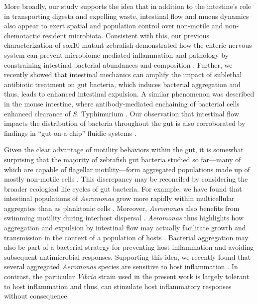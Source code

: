 More broadly, our study supports the idea that in addition to the intestine's role in transporting digesta and expelling waste, intestinal flow and mucus dynamics also appear to exert spatial and population control over non-motile and non-chemotactic resident microbiota. Consistent with this, our previous characterization of sox10 mutant zebrafish demonstrated how the enteric nervous system can prevent microbiome-mediated inflammation and pathology by constraining intestinal bacterial abundances and composition \cite{rolig_enteric_2017}. Further, we recently showed that intestinal mechanics can amplify the impact of sublethal antibiotic treatment on gut bacteria, which induces bacterial aggregation and thus, leads to enhanced intestinal expulsion\cite{schlomann_sublethal_2019}. A similar phenomenon was described in the mouse intestine, where antibody-mediated enchaining of bacterial cells enhanced clearance of \textit{S. }Typhimurium \cite{moor_high-avidity_2017}. Our observation that intestinal flow impacts the distribution of bacteria throughout the gut is also corroborated by findings in ``gut-on-a-chip'' fluidic systems \cite{cremer_effect_2016}. 

Given the clear advantage of motility behaviors within the gut, it is somewhat surprising that the majority of zebrafish gut bacteria studied so far—many of which are capable of flagellar motility—form aggregated populations made up of mostly non-motile cells \cite{wiles_modernized_2018}. This discrepancy may be reconciled by considering the broader ecological life cycles of gut bacteria. For example, we have found that intestinal populations of \textit{Aeromonas} grow more rapidly within multicellular aggregates than as planktonic cells \cite{jemielita_spatial_2014}. Moreover, \textit{Aeromonas} also benefits from swimming motility during interhost dispersal \cite{robinson_experimental_2018}. \textit{Aeromonas} thus highlights how aggregation and expulsion by intestinal flow may actually facilitate growth and transmission in the context of a population of hosts \cite{robinson_scales_2019}. Bacterial aggregation may also be part of a bacterial strategy for preventing host inflammation and avoiding subsequent antimicrobial responses. Supporting this idea, we recently found that several aggregated \textit{Aeromonas} species are sensitive to host inflammation \cite{rolig_bacterial_2018}. In contrast, the particular \textit{Vibrio} strain used in the present work is largely tolerant to host inflammation \cite{rolig_individual_2015} and thus, can stimulate host inflammatory responses without consequence.

